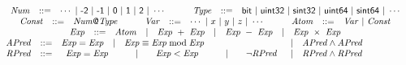 
\begin{figure*}
  \centering
  \begin{math}
    \begin{array}{rclclcl}
      \multicolumn{7}{c}{
      \begin{array}{rclcrcl}
        \mathit{Num} & ::= & \cdots \ |\ \mytextsf{-2} \ |\ \mytextsf{-1}
                             \ |\ \mytextsf{0} \ |\ \mytextsf{1} \ |\
                             \mytextsf{2} \ |\  \cdots
        & \hspace{1em} &
        \mathit{Type} & ::= & \mytextsf{bit}\ |\
                              \mytextsf{uint32}\ |\ \mytextsf{sint32}\ |\
                              \mytextsf{uint64}\ |\ \mytextsf{sint64}\ |\ \cdots
      \end{array}
      }\\
      \multicolumn{7}{c}{
      \begin{array}{rclcrclcrcl}
      \mathit{Const} & ::= & \mathit{Num}\mytextsf{@}\mathit{Type}
      & \hspace{1em} &
      \mathit{Var} & ::= & \cdots\ |\ x \ |\ y \ |\ z \ |\ \cdots
      & \hspace{1em} &
      \mathit{Atom} & ::= & \mathit{Var} \ |\ \mathit{Const}
      \end{array}
      }
      \\
      \multicolumn{7}{c}{
      \begin{array}{rclclclcl}
        \mathit{Exp} & ::= & \mathit{Atom}
        & | & \mathit{Exp}\ +\ \mathit{Exp}
        & | & \mathit{Exp}\ -\ \mathit{Exp}
        & | & \mathit{Exp}\ \times\ \mathit{Exp}
      \end{array}
      }
      \\
      \mathit{APred} & ::= &
        \mathit{Exp} = \mathit{Exp}
      & | & \mathit{Exp} \equiv \mathit{Exp} \bmod \mathit{Exp}
      & | & \mathit{APred} \wedge \mathit{APred}
      \\
      \mathit{RPred} & ::= &
      \multicolumn{3}{l}{
        \begin{array}{lclclcl}
          \mathit{Exp} = \mathit{Exp}
          & \hspace{2em}|\hspace{1em} & \mathit{Exp} < \mathit{Exp}
          & \hspace{2em}|\hspace{1em} & \neg \mathit{RPred}
        \end{array}
      }
      & | & \mathit{RPred} \wedge \mathit{RPred}
      \\

\end{array}
\end{math}
\end{figure*}
